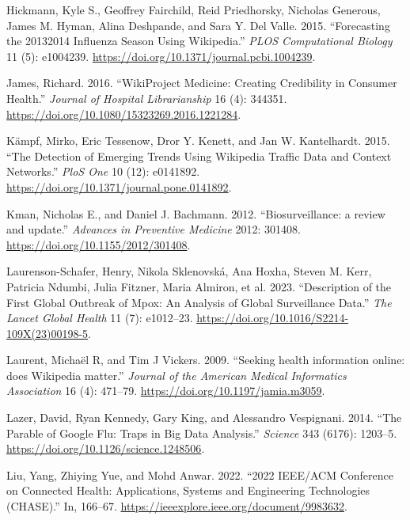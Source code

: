 \documentclass[
  12pt,
]{article}
\newlength{\cslhangindent}
\newenvironment{CSLReferences}[2] %
 {\begin{list}{}{%
  \setlength{\itemindent}{0pt}
  \setlength{\leftmargin}{0pt}
  \setlength{\parsep}{0pt}
  \ifodd #1
   \setlength{\leftmargin}{\cslhangindent}
   \setlength{\itemindent}{-1\cslhangindent}
  \fi
  \setlength{\itemsep}{#2\baselineskip}}}
 {\end{list}}
\begin{document}
\begin{CSLReferences}{1}{0}
Hickmann, Kyle S., Geoffrey Fairchild, Reid Priedhorsky, Nicholas
Generous, James M. Hyman, Alina Deshpande, and Sara Y. Del Valle. 2015.
{``Forecasting the 2013{\textendash}2014 Influenza Season Using
Wikipedia.''} \emph{PLOS Computational Biology} 11 (5): e1004239.
\url{https://doi.org/10.1371/journal.pcbi.1004239}.

James, Richard. 2016. {``WikiProject Medicine: Creating Credibility in
Consumer Health.''} \emph{Journal of Hospital Librarianship} 16 (4):
344351. \url{https://doi.org/10.1080/15323269.2016.1221284}.

Kämpf, Mirko, Eric Tessenow, Dror Y. Kenett, and Jan W. Kantelhardt.
2015. {``The Detection of Emerging Trends Using Wikipedia Traffic Data
and Context Networks.''} \emph{PloS One} 10 (12): e0141892.
\url{https://doi.org/10.1371/journal.pone.0141892}.

Kman, Nicholas E., and Daniel J. Bachmann. 2012. {``Biosurveillance: a
review and update.''} \emph{Advances in Preventive Medicine} 2012:
301408. \url{https://doi.org/10.1155/2012/301408}.

Laurenson-Schafer, Henry, Nikola Sklenovská, Ana Hoxha, Steven M. Kerr,
Patricia Ndumbi, Julia Fitzner, Maria Almiron, et al. 2023.
{``Description of the First Global Outbreak of Mpox: An Analysis of
Global Surveillance Data.''} \emph{The Lancet Global Health} 11 (7):
e1012--23. \url{https://doi.org/10.1016/S2214-109X(23)00198-5}.

Laurent, Michaël R, and Tim J Vickers. 2009. {``Seeking health
information online: does Wikipedia matter.''} \emph{Journal of the
American Medical Informatics Association} 16 (4): 471--79.
\url{https://doi.org/10.1197/jamia.m3059}.

Lazer, David, Ryan Kennedy, Gary King, and Alessandro Vespignani. 2014.
{``The Parable of Google Flu: Traps in Big Data Analysis.''}
\emph{Science} 343 (6176): 1203--5.
\url{https://doi.org/10.1126/science.1248506}.

Liu, Yang, Zhiying Yue, and Mohd Anwar. 2022. {``2022 IEEE/ACM
Conference on Connected Health: Applications, Systems and Engineering
Technologies (CHASE).''} In, 166--67.
\url{https://ieeexplore.ieee.org/document/9983632}.


\end{CSLReferences}
\end{document}
